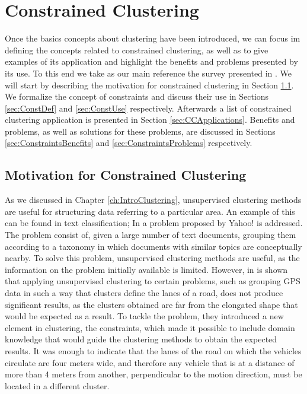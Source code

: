 \chapter{Constrained Clustering}\label{ch:ConstrainedClustering}

Once the basics concepts about clustering have been introduced, we can focus im defining the concepts related to constrained clustering, as well as to give examples of its application and highlight the benefits and problems presented by its use. To this end we take as our main reference the survey presented in \cite{davidson2007survey}. We will start by describing the motivation for constrained clustering in Section \ref{sec:CCMotiv}. We formalize the concept of constraints and discuss their use in Sections \ref{sec:ConstDef} and \ref{sec:ConstUse} respectively. Afterwards a list of constrained clustering application is presented in Section \ref{sec:CCApplications}. Benefits and problems, as well as solutions for these problems, are discussed in Sections \ref{sec:ConstraintsBenefits} and \ref{sec:ConstraintsProblems} respectively.

\section{Motivation for Constrained Clustering} \label{sec:CCMotiv}

As we discussed in Chapter \ref{ch:IntroClustering}, unsupervised clustering methods are useful for structuring data referring to a particular area. An example of this can be found in text classification; In \cite{cohn2003semi} a problem proposed by Yahoo! is addressed. The problem consist of, given a large number of text documents, grouping them according to a taxonomy in which documents with similar topics are conceptually nearby. To solve this problem, unsupervised clustering methods are useful, as the information on the problem initially available is limited. However, in \cite{wagstaff2001constrained} is shown that applying unsupervised clustering to certain problems, such as grouping \acf{GPS} data in such a way that clusters define the lanes of a road, does not produce significant results, as the clusters obtained are far from the elongated shape that would be expected as a result. To tackle the problem, they introduced a new element in clustering, the constraints, which made it possible to include domain knowledge that would guide the clustering methods to obtain the expected results. It was enough to indicate that the lanes of the road on which the vehicles circulate are four meters wide, and therefore any vehicle that is at a distance of more than 4 meters from another, perpendicular to the motion direction, must be located in a different cluster.

